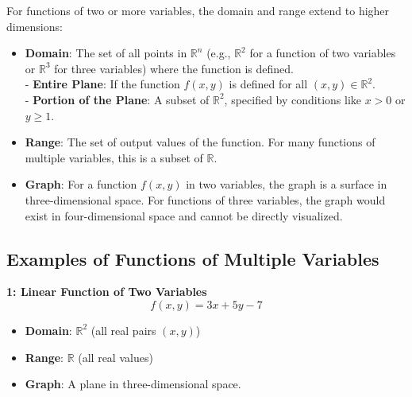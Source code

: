 \documentclass[a4paper,12pt,openany]{book}
\begin{document}
For functions of two or more variables, the domain and range extend to higher dimensions:
\begin{itemize}
    \item \textbf{Domain}: The set of all points in \(\mathbb{R}^n\) (e.g., \(\mathbb{R}^2\) for a function of two variables or \(\mathbb{R}^3\) for three variables) where the function is defined.\\
        - \textbf{Entire Plane}: If the function \( f(x, y) \) is defined for all \((x, y) \in \mathbb{R}^2\).\\
        - \textbf{Portion of the Plane}: A subset of \(\mathbb{R}^2\), specified by conditions like \(x > 0\) or \(y \geq 1\).
    \item \textbf{Range}: The set of output values of the function. For many functions of multiple variables, this is a subset of \(\mathbb{R}\).
    \item \textbf{Graph}: For a function \( f(x, y) \) in two variables, the graph is a surface in three-dimensional space. For functions of three variables, the graph would exist in four-dimensional space and cannot be directly visualized.
\end{itemize}

\subsection*{Examples of Functions of Multiple Variables}

\textbf{1: Linear Function of Two Variables}
    \[
    f(x, y) = 3x + 5y - 7
    \]
    \begin{itemize}
        \item \textbf{Domain}: \(\mathbb{R}^2\) (all real pairs \((x, y)\))
        \item \textbf{Range}: \(\mathbb{R}\) (all real values)
        \item \textbf{Graph}: A plane in three-dimensional space.
    \end{itemize}
\end{document}
